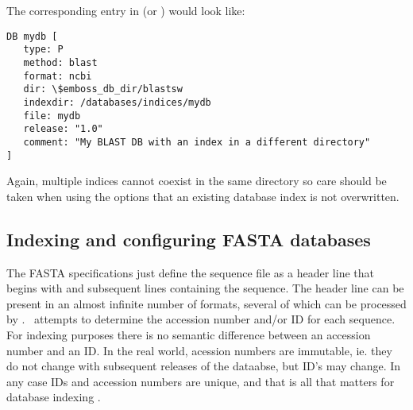 \documentclass{report}
\begin{document}
The corresponding entry in  (or
) would look like:


\begin{verbatim}
DB mydb [
   type: P
   method: blast
   format: ncbi
   dir: \$emboss_db_dir/blastsw
   indexdir: /databases/indices/mydb
   file: mydb
   release: "1.0"
   comment: "My BLAST DB with an index in a different directory"
]
\end{verbatim}

Again, multiple indices cannot coexist in the same directory so care
should be taken when using the  options that an
existing database index is not overwritten.

\begin{comment}
\subsubsection{FASTA formats used with \progname{dbiblast}}
\label{subsec:fasta}
The following FASTA formats are recognised by \progname{dbiblast}:

\begin{tabular}[t]{|l|l|}\hline \setlength{\baselineskip}{1.2\baselineskip}
GENBANK/NCBI & \ilcomm{> \ldots |accno|id \ldots }\\
\hline
GCG & \ilcomm{>{\sl dbname}:accno id \ldots }\\
\hline
SIMPLE &\ilcomm{ >accno id \ldots} \\
\hline
ID & \ilcomm{>id}\\
\hline
\end{tabular}
\ilcomm{...} refers to any text. Note that the ID must be the only
item in the header for the ID format.

\end{comment}
\subsection{Indexing and configuring FASTA databases}

The FASTA specifications just define the sequence file as a header
line that begins with \ilcomm{>} and subsequent lines containing the
sequence.  The header line can be present in an almost infinite number
of formats, several of which can be processed by \EMBOSS.  \EMBOSS\
attempts to determine the accession number and/or ID for each
sequence.  For indexing purposes there is no semantic difference
between an accession number and an ID. In the real world, acession
numbers are immutable, ie. they do not change with subsequent releases
of the dataabse, but ID's may change. In any case IDs and accession
numbers are unique, and that is all that matters for database indexing
\EMBOSS.
\end{document}
